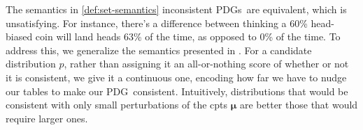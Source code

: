 \documentclass{article}
\newcommand{\bmu}{\boldsymbol{\mu}}
\newcommand{\V}{\mathcal V}
\newcommand{\MN}{PDG}
\newcommand{\MNs}{\MN s}
\numberwithin{equation}{section}
\begin{document}
	The semantics in \cref{def:set-semantics} inconsistent \MNs\ are equivalent, which is unsatisfying. 
	For instance, there's a difference between thinking a 60\% head-biased coin will land heads 63\% of the time, as opposed to 0\% of the time. %
 	To address this, we generalize the semantics presented in . 
 	For a candidate distribution $p$,
	rather than assigning it an all-or-nothing score of whether or not it is consistent, we give it a continuous one, encoding how far we have to nudge our tables to make our \MN\ consistent. Intuitively, distributions that would be consistent with only small perturbations of the cpts $\bmu$ are better those that would require larger ones. 
\end{document}
